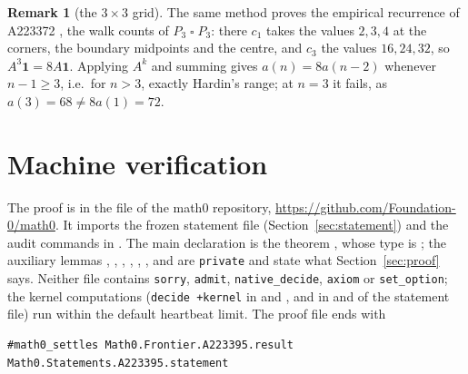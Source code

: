 \documentclass[11pt]{amsart}
\theoremstyle{plain}
\theoremstyle{definition}
\newtheorem{remark}[theorem]{Remark}
\newcommand{\one}{\mathbf{1}}
\newcommand{\sq}{\mathbin{\square}}
\begin{document}
\begin{remark}[the $3\times3$ grid]\label{rem:3x3}
The same method proves the empirical recurrence of A223372 \cite{A223372}, the walk counts of $P_3\sq P_3$: there $c_1$ takes the values $2,3,4$ at the corners, the boundary midpoints and the centre, and $c_3$ the values $16,24,32$, so $A^3\one=8A\one$. Applying $A^k$ and summing gives $a(n)=8a(n-2)$ whenever $n-1\ge3$, i.e.\ for $n>3$, exactly Hardin's range; at $n=3$ it fails, as $a(3)=68\ne8a(1)=72$.
\end{remark}

\section{Machine verification}\label{sec:lean}

The proof is in the file  of the math0 repository, \url{https://github.com/Foundation-0/math0}. It imports the frozen statement file  (Section~\ref{sec:statement}) and the audit commands in . The main declaration is the theorem , whose type is ; the auxiliary lemmas , , , , , ,  and  are \texttt{private} and state what Section~\ref{sec:proof} says. Neither file contains \texttt{sorry}, \texttt{admit}, \texttt{native\_decide}, \texttt{axiom} or \texttt{set\_option}; the kernel computations (\texttt{decide +kernel} in  and , and in  and  of the statement file) run within the default heartbeat limit. The proof file ends with

\noindent\begin{minipage}{\linewidth}
\begin{lstlisting}
#math0_settles Math0.Frontier.A223395.result Math0.Statements.A223395.statement
\end{lstlisting}
\end{minipage}
\end{document}
